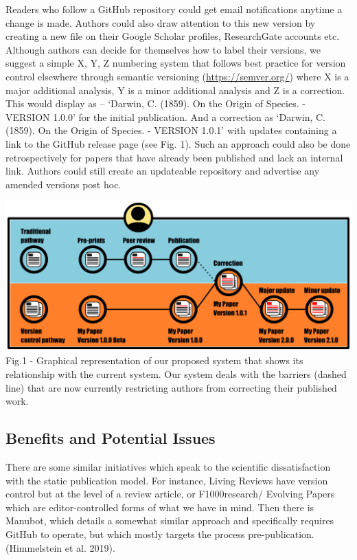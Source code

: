 \documentclass[
]{article}
\begin{document}
Readers who follow a GitHub repository could get email notifications
anytime a change is made. Authors could also draw attention to this new
version by creating a new file on their Google Scholar profiles,
ResearchGate accounts etc. Although authors can decide for themselves
how to label their versions, we suggest a simple X, Y, Z numbering
system that follows best practice for version control elsewhere through
semantic versioning (\url{https://semver.org/}) where X is a major
additional analysis, Y is a minor additional analysis and Z is a
correction. This would display as -- `Darwin, C. (1859). On the Origin
of Species. - VERSION 1.0.0' for the initial publication. And a
correction as `Darwin, C. (1859). On the Origin of Species. - VERSION
1.0.1' with updates containing a link to the GitHub release page (see
Fig. 1). Such an approach could also be done retrospectively for papers
that have already been published and lack an internal link. Authors
could still create an updateable repository and advertise any amended
versions post hoc.

\includegraphics{./Figure/Figure1.pdf} Fig.1 - Graphical representation
of our proposed system that shows its relationship with the current
system. Our system deals with the barriers (dashed line) that are now
currently restricting authors from correcting their published work.

\hypertarget{benefits-and-potential-issues}{%
\subsection{Benefits and Potential
Issues}\label{benefits-and-potential-issues}}

There are some similar initiatives which speak to the scientific
dissatisfaction with the static publication model. For instance, Living
Reviews have version control but at the level of a review article, or
F1000research/ Evolving Papers which are editor-controlled forms of what
we have in mind. Then there is Manubot, which details a somewhat similar
approach and specifically requires GitHub to operate, but which mostly
targets the process pre-publication. (Himmelstein et al. 2019).
\end{document}
